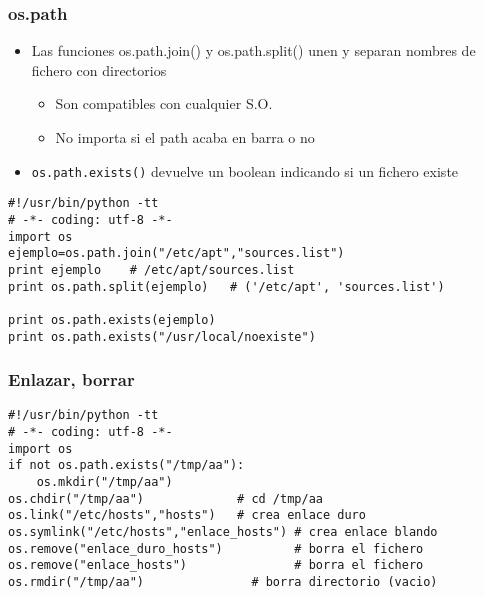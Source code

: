 \documentclass[ucs]{beamer}
\begin{document}
\begin{frame}[fragile]
\frametitle{os.path}

\begin{itemize}
\item
Las funciones os.path.join() y os.path.split()
unen y separan nombres de fichero con directorios

\begin{itemize}

\item
Son compatibles con cualquier S.O.
\item
No importa si el path acaba en barra o no
\end{itemize}
\item
\verb|os.path.exists()| devuelve un boolean indicando si un fichero existe
\end{itemize}


  \begin{scriptsize}
  \begin{verbatim}
#!/usr/bin/python -tt
# -*- coding: utf-8 -*-
import os
ejemplo=os.path.join("/etc/apt","sources.list")
print ejemplo    # /etc/apt/sources.list
print os.path.split(ejemplo)   # ('/etc/apt', 'sources.list')

print os.path.exists(ejemplo)
print os.path.exists("/usr/local/noexiste")

  \end{verbatim}
  \end{scriptsize}

\end{frame}


\begin{frame}[fragile]
\frametitle{Enlazar,  borrar}
  \begin{scriptsize}
  \begin{verbatim}
#!/usr/bin/python -tt
# -*- coding: utf-8 -*-
import os
if not os.path.exists("/tmp/aa"):
    os.mkdir("/tmp/aa")
os.chdir("/tmp/aa")             # cd /tmp/aa
os.link("/etc/hosts","hosts")   # crea enlace duro
os.symlink("/etc/hosts","enlace_hosts") # crea enlace blando
os.remove("enlace_duro_hosts")          # borra el fichero
os.remove("enlace_hosts")               # borra el fichero
os.rmdir("/tmp/aa")               # borra directorio (vacio)
  \end{verbatim}
  \end{scriptsize}

\end{frame}
\end{document}
